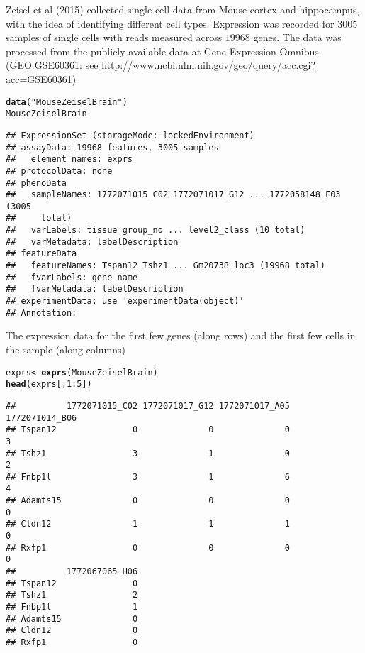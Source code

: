 \documentclass[12pt]{article}\usepackage[]{graphicx}\usepackage[usenames,dvipsnames]{color}
\makeatletter
\newcommand{\hlnum}[1]{\textcolor[rgb]{0.686,0.059,0.569}{#1}}%
\newcommand{\hlstr}[1]{\textcolor[rgb]{0.192,0.494,0.8}{#1}}%
\newcommand{\hlopt}[1]{\textcolor[rgb]{0,0,0}{#1}}%
\newcommand{\hlstd}[1]{\textcolor[rgb]{0.345,0.345,0.345}{#1}}%
\newcommand{\hlkwb}[1]{\textcolor[rgb]{0.69,0.353,0.396}{#1}}%
\newcommand{\hlkwd}[1]{\textcolor[rgb]{0.737,0.353,0.396}{\textbf{#1}}}%
\newenvironment{kframe}{%
 \def\at@end@of@kframe{}%
 \ifinner\ifhmode%
  \def\at@end@of@kframe{\end{minipage}}%
  \begin{minipage}{\columnwidth}%
 \fi\fi%
 \def\FrameCommand##1{\hskip\@totalleftmargin \hskip-\fboxsep
 \colorbox{shadecolor}{##1}\hskip-\fboxsep
     \hskip-\linewidth \hskip-\@totalleftmargin \hskip\columnwidth}%
 \MakeFramed {\advance\hsize-\width
   \@totalleftmargin\z@ \linewidth\hsize
   \@setminipage}}%
 {\par\unskip\endMakeFramed%
 \at@end@of@kframe}
\newenvironment{knitrout}{}{} %
\makeatother
\begin{document}
Zeisel et al (2015) \cite{Zeisel2015} collected single cell data from Mouse cortex and
hippocampus, with the idea of identifying different cell types. Expression was recorded for $3005$ samples of single cells with reads measured across $19968$ genes. The data
was processed from the publicly available data at Gene Expression Omnibus (GEO:GSE60361: see \url{http://www.ncbi.nlm.nih.gov/geo/query/acc.cgi?acc=GSE60361})

\begin{knitrout}
\color{fgcolor}\begin{kframe}
\begin{alltt}
\hlkwd{data}\hlstd{(}\hlstr{"MouseZeiselBrain"}\hlstd{)}
\hlstd{MouseZeiselBrain}
\end{alltt}
\begin{verbatim}
## ExpressionSet (storageMode: lockedEnvironment)
## assayData: 19968 features, 3005 samples 
##   element names: exprs 
## protocolData: none
## phenoData
##   sampleNames: 1772071015_C02 1772071017_G12 ... 1772058148_F03 (3005
##     total)
##   varLabels: tissue group_no ... level2_class (10 total)
##   varMetadata: labelDescription
## featureData
##   featureNames: Tspan12 Tshz1 ... Gm20738_loc3 (19968 total)
##   fvarLabels: gene_name
##   fvarMetadata: labelDescription
## experimentData: use 'experimentData(object)'
## Annotation:
\end{verbatim}
\end{kframe}
\end{knitrout}

The expression data for the first few genes (along rows) and the first few
cells in the sample (along columns)

\begin{knitrout}
\color{fgcolor}\begin{kframe}
\begin{alltt}
\hlstd{exprs} \hlkwb{<-} \hlkwd{exprs}\hlstd{(MouseZeiselBrain)}
\hlkwd{head}\hlstd{(exprs[,}\hlnum{1}\hlopt{:}\hlnum{5}\hlstd{])}
\end{alltt}
\begin{verbatim}
##          1772071015_C02 1772071017_G12 1772071017_A05 1772071014_B06
## Tspan12               0              0              0              3
## Tshz1                 3              1              0              2
## Fnbp1l                3              1              6              4
## Adamts15              0              0              0              0
## Cldn12                1              1              1              0
## Rxfp1                 0              0              0              0
##          1772067065_H06
## Tspan12               0
## Tshz1                 2
## Fnbp1l                1
## Adamts15              0
## Cldn12                0
## Rxfp1                 0
\end{verbatim}
\end{kframe}
\end{knitrout}
\end{document}
